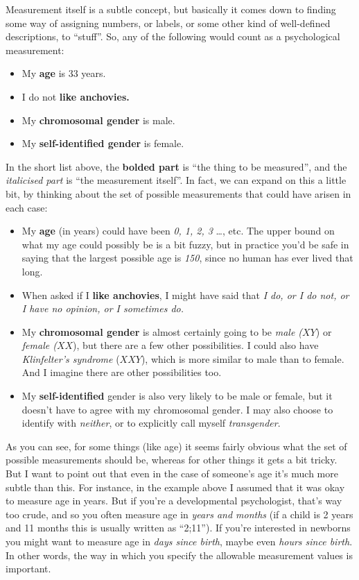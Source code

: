 \documentclass[
  letterpaper,
]{book}
\providecommand{\tightlist}{%
  \setlength{\itemsep}{0pt}\setlength{\parskip}{0pt}}\usepackage{longtable,booktabs,array}
\begin{document}
Measurement itself is a subtle concept, but basically it comes down to
finding some way of assigning numbers, or labels, or some other kind of
well-defined descriptions, to ``stuff''. So, any of the following would
count as a psychological measurement:

\begin{itemize}
\tightlist
\item
  My \textbf{age} is 33 years.
\item
  I do not \textbf{like anchovies.}
\item
  My \textbf{chromosomal gender} is male.
\item
  My \textbf{self-identified gender} is female.
\end{itemize}

In the short list above, the \textbf{bolded part} is ``the thing to be
measured'', and the \emph{italicised part} is ``the measurement
itself''. In fact, we can expand on this a little bit, by thinking about
the set of possible measurements that could have arisen in each case:

\begin{itemize}
\tightlist
\item
  My \textbf{age} (in years) could have been \emph{0, 1, 2, 3} \ldots,
  etc. The upper bound on what my age could possibly be is a bit fuzzy,
  but in practice you'd be safe in saying that the largest possible age
  is \emph{150}, since no human has ever lived that long.
\item
  When asked if I \textbf{like anchovies}, I might have said that
  \emph{I do, or I do not, or I have no opinion, or I sometimes do.}
\item
  My \textbf{chromosomal gender} is almost certainly going to be
  \emph{male (}\(XY\)) or \emph{female (}\(XX\)), but there are a few
  other possibilities. I could also have \emph{Klinfelter's syndrome}
  (\(XXY\)), which is more similar to male than to female. And I imagine
  there are other possibilities too.
\item
  My \textbf{self-identified} gender is also very likely to be male or
  female, but it doesn't have to agree with my chromosomal gender. I may
  also choose to identify with \emph{neither}, or to explicitly call
  myself \emph{transgender}.
\end{itemize}

As you can see, for some things (like age) it seems fairly obvious what
the set of possible measurements should be, whereas for other things it
gets a bit tricky. But I want to point out that even in the case of
someone's age it's much more subtle than this. For instance, in the
example above I assumed that it was okay to measure age in years. But if
you're a developmental psychologist, that's way too crude, and so you
often measure age in \emph{years and months} (if a child is 2 years and
11 months this is usually written as ``2;11''). If you're interested in
newborns you might want to measure age in \emph{days since birth}, maybe
even \emph{hours since birth}. In other words, the way in which you
specify the allowable measurement values is important.
\end{document}
